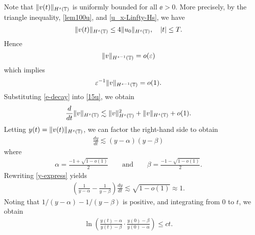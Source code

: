%
%
Note
that $\|v(t)\|_{H^s(\mathbb{T})}$ is uniformly bounded for all $\ee > 0$. More 
precisely, by
the triangle inequality,  \eqref{lem100u}, and \eqref{u_x-Linfty-Hs},
we have
%
%
\begin{equation}
	\label{bound-no-ep}
\begin{split}
\|v(t) \|_{H^s(\mathbb{T})}
\le 4 \|u_0\|_{H^s(\mathbb{T})}, \quad |t| \le T.
\end{split}
\end{equation}
%
%
Hence
\begin{equation*}
\|v\|_{H^{s-1}(\mathbb{T})} = o(\varepsilon)
\end{equation*}
%
%
which implies
\begin{equation}
	\label{e-decay}
	\varepsilon^{-1} \|v\|_{H^{s-1}(\mathbb{T})} = o(1).
\end{equation}
%
%
Substituting \eqref{e-decay} into \eqref{15u}, we obtain
%
%
\begin{equation}
\begin{split}
\frac{d}{dt} \|v\|_{H^s(\mathbb{T})} \lesssim
\|v\|_{H^s(\mathbb{T})}^2 + \|v\|_{H^s(\mathbb{T})} + o(1).
\label{202x}
\end{split}
\end{equation}
%
%
Letting $y(t) = \|v(t)\|_{H^s(\mathbb{T})}$, we can factor the right-hand side to 
obtain
%
%
\begin{equation}
	\label{y-express}
	\begin{split}
		\frac{dy}{dt} \lesssim (y-\alpha)(y-\beta)	
	\end{split}
\end{equation}
%
%
where
%
%
\begin{equation}
	\begin{split}
		\alpha = \frac{-1 + \sqrt{1-o(1)}}{2} \qquad \text{and} \qquad
		\beta = \frac{-1 - \sqrt{1-o(1)}}{2}.
	\end{split}
\end{equation}
%
%
Rewriting \eqref{y-express} yields
%
%
\begin{equation*}
	\begin{split}
		\left( \frac{1}{y-\alpha} - \frac{1}{y-\beta} 
		\right) \frac{dy}{dt} \lesssim \sqrt{1- o(1)} \approx 1.
	\end{split}
\end{equation*}
%
%
Noting that $1/(y - \alpha) - 1/(y - \beta)$ is positive, and integrating 
from $0$ to $t$, we obtain 
%
%
\begin{equation*}
	\begin{split}
		\ln \left (\frac{y(t) - \alpha}{y(t) - \beta} \cdot 
		\frac{y(0) - \beta}{y(0) - \alpha} \right ) \le ct.	
	\end{split}
\end{equation*}
